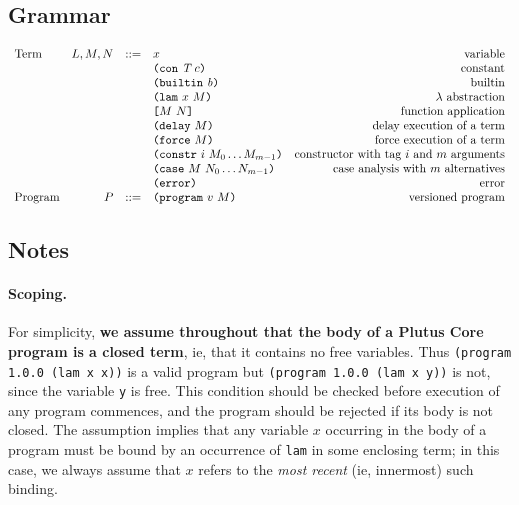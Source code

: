 \subsection{Grammar}
\begin{minipage}{\linewidth}
    \centering
    \[\begin{array}{lrclr}
    \textrm{Term}       & L,M,N  & ::= & x                               & \textrm{variable}\\
                        &        &     & \texttt{(} \texttt{con} ~ \textit{T} ~ c \texttt{)}                    & \textrm{constant}\\
                        &        &     & \texttt{(} \texttt{builtin} ~ \mathit{b} \texttt{)}                     & \textrm{builtin}\\
                        &        &     & \texttt{(} \texttt{lam} ~ x ~ M  \texttt{)}                     & \textrm{$\lambda$ abstraction}\\
                        &        &     & \texttt{[} M ~ N \texttt{]}                     & \textrm{function application}\\
                        &        &     & \texttt{(} \texttt{delay} ~ M \texttt{)}                       & \textrm{delay execution of a term}\\
                        &        &     & \texttt{(} \texttt{force} ~ M \texttt{)}                       & \textrm{force execution of a term}\\
                        &        &     & \texttt{(} \texttt{constr} ~ i ~ M_0 \ldots M_{m-1} \texttt{)}  & \textrm{constructor with tag $i$ and $m$ arguments}\\
                        &        &     & \texttt{(} \texttt{case} ~ M ~ N_0 \ldots N_{m-1} \texttt{)}    & \textrm{case analysis with $m$ alternatives}\\
                        &        &     & \texttt{(} \texttt{error} \texttt{)}                         & \textrm{error}\\
        \textrm{Program}& P      & ::= & \texttt{(} \texttt{program} ~ v ~ M \texttt{)}                  & \textrm{versioned program}

    \end{array}\]
    \label{fig:untyped-grammar}
\end{minipage}


\subsection{Notes}
\label{sec:grammar-notes}
\paragraph{Scoping.} For simplicity, \textbf{we assume throughout that the body of a
Plutus Core program is a closed term}, ie, that it contains no free
variables.  Thus \texttt{(program 1.0.0 (lam x x))} is a valid program but
\texttt{(program 1.0.0 (lam x y))} is not, since the variable \texttt{y} is
free. This condition should be checked before execution of any program
commences, and the program should be rejected if its body is not closed.  The
assumption implies that any variable $x$ occurring in the body of a program must
be bound by an occurrence of \texttt{lam} in some enclosing term; in this case,
we always assume that $x$ refers to the \textit{most recent} (ie, innermost)
such binding.

